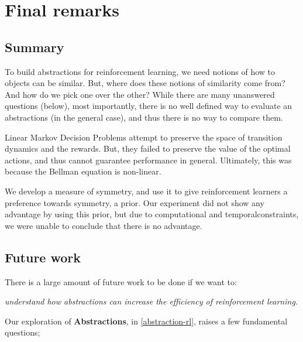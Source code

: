 \chapter{Final remarks}\label{C:con}

\section{Summary}

To build abstractions for reinforcement learning, we need notions of how to objects can be similar.
But, where does these notions of similarity come from? And how do we pick one over the other?
While there are many unanswered questions (below), most importantly,
there is no well defined way to evaluate an abstractions (in the general case), and thus there is no way to compare them.

Linear Markov Decision Problems attempt to preserve the space of transition dynamics and the rewards.
But, they failed to preserve the value of the optimal actions, and thus cannot
guarantee performance in general. Ultimately, this was because the Bellman equation is non-linear.

We develop a measure of symmetry, and use it to give reinforcement learners a preference towards symmetry, a prior.
Our experiment did not show any advantage by using this prior, but due to computational and temporal\footnotemark constraints,
we were unable to conclude that there is no advantage.


\newpage
\section{Future work}

There is a large amount of future work to be done if we want to:

\begin{displayquote}
\textit{understand how abstractions can increase the efficiency of reinforcement learning.}
\end{displayquote}

Our exploration of \textbf{Abstractions}, in \ref{abstraction-rl}, raises a few fundamental questions;

